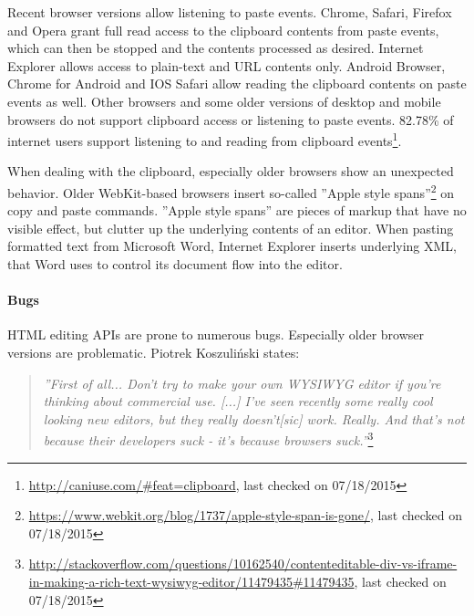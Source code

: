 Recent browser versions allow listening to paste events. Chrome, Safari, Firefox and Opera grant full read access to the clipboard contents from paste events, which can then be stopped and the contents processed as desired. Internet Explorer allows access to plain-text and URL contents only. Android Browser, Chrome for Android and IOS Safari allow reading the clipboard contents on paste events as well. Other browsers and some older versions of desktop and mobile browsers do not support clipboard access or listening to paste events. 82.78\% of internet users support listening to and reading from clipboard events\footnote{\url{http://caniuse.com/\#feat=clipboard}, last checked on 07/18/2015}.

When dealing with the clipboard, especially older browsers show an unexpected behavior. Older WebKit-based browsers insert so-called ''Apple style spans''\footnote{\url{https://www.webkit.org/blog/1737/apple-style-span-is-gone/}, last checked on 07/18/2015} on copy and paste commands. ''Apple style spans'' are pieces of markup that have no visible effect, but clutter up the underlying contents of an editor. When pasting formatted text from Microsoft Word, Internet Explorer inserts underlying XML, that Word uses to control its document flow into the editor.


\paragraph{Bugs} 

HTML editing APIs are prone to numerous bugs. Especially older browser versions are problematic. Piotrek Koszuli\'{n}ski states:

\begin{quotation}
\textit{''First of all... Don't try to make your own WYSIWYG editor if you're thinking about commercial use. [...] I've seen recently some really cool looking new editors, but they really doesn't[sic] work. Really. And that's not because their developers suck - it's because browsers suck.''}\footnote{\url{http://stackoverflow.com/questions/10162540/contenteditable-div-vs-iframe-in-making-a-rich-text-wysiwyg-editor/11479435\#11479435}, last checked on 07/18/2015}
\end{quotation}

